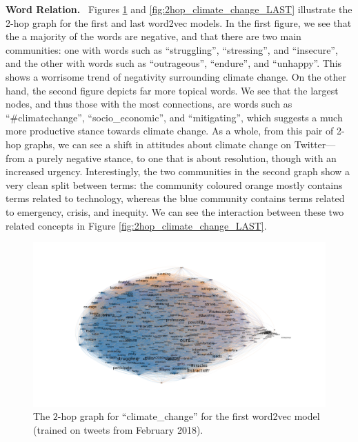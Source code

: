 \documentclass{paper}
\newcommand{\inlineSection}[1]{\vspace{0.5em}\noindent\textbf{#1.}~}
\begin{document}
\inlineSection{Word Relation} Figures \ref{fig:2hop_climate_change_FIRST} and \ref{fig:2hop_climate_change_LAST} illustrate the 2-hop graph for the first and last word2vec models. In the first figure, we see that the a majority of the words are negative, and that there are two main communities: one with words such as ``struggling'', ``stressing'', and ``insecure'', and the other with words such as ``outrageous'', ``endure'', and ``unhappy''. This shows a worrisome trend of negativity surrounding climate change. On the other hand, the second figure depicts far more topical words. We see that the largest nodes, and thus those with the most connections, are words such as ``\#climatechange'', ``socio\_economic'', and ``mitigating'', which suggests a much more productive stance towards climate change. As a whole, from this pair of 2-hop graphs, we can see a shift in attitudes about climate change on Twitter---from a purely negative stance, to one that is about resolution, though with an increased urgency. Interestingly, the two communities in the second graph show a very clean split between terms: the community coloured orange mostly contains terms related to technology, whereas the blue community contains terms related to emergency, crisis, and inequity. We can see the interaction between these two related concepts in Figure \ref{fig:2hop_climate_change_LAST}.

\begin{figure}
    \centering
    \includegraphics[width=\textwidth]{2Hop_ClimateChange_2018_02.png}
    \caption{The $2$-hop graph for ``climate\_change'' for the first word2vec model (trained on tweets from February 2018).}
    \label{fig:2hop_climate_change_FIRST}
\end{figure}
\end{document}
